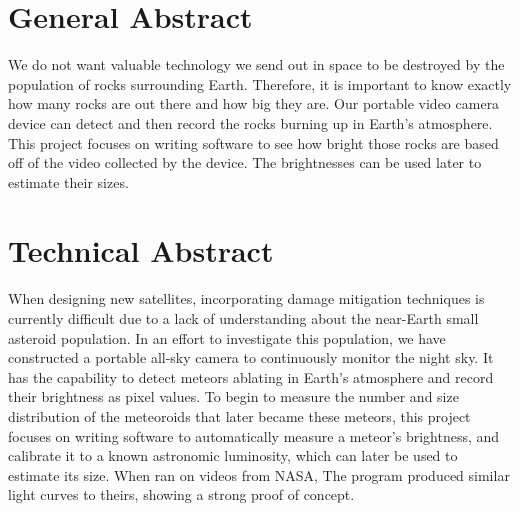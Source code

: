 \section*{General Abstract}
We do not want valuable technology we send out in space to be destroyed by the population of rocks surrounding Earth. Therefore, it is important to know exactly how many rocks are out there and how big they are. Our portable video camera device can detect and then record the rocks burning up in Earth's atmosphere. This project focuses on writing software to see how bright those rocks are based off of the video collected by the device. The brightnesses can be used later to estimate their sizes.

\section*{Technical Abstract}
When designing new satellites, incorporating damage mitigation techniques is currently difficult due to a lack of understanding about the near-Earth small asteroid population. In an effort to investigate this population, we have constructed a portable all-sky camera to continuously monitor the night sky. It has the capability to detect meteors ablating in Earth's atmosphere and record their brightness as pixel values. To begin to measure the number and size distribution of the meteoroids that later became these meteors, this project focuses on writing software to automatically measure a meteor's brightness, and  calibrate it to a known astronomic luminosity, which can later be used to estimate its size. When ran on videos from NASA, The program produced similar light curves to theirs, showing a strong proof of concept.
